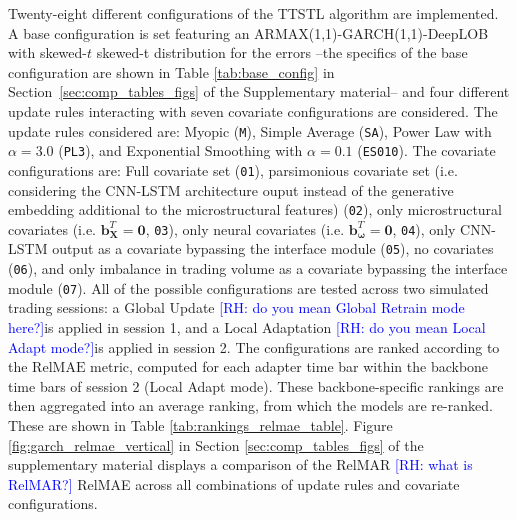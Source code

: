 \documentclass[10pt,a4paper,oneside]{article}
\newcommand{\rh}[1]{\textcolor{blue}{\textsf{[RH: #1]}}}
\providecommand{\DIFaddtex}[1]{{\protect\color{blue} \sf #1}} %
\providecommand{\DIFdeltex}[1]{{\protect\color{red} \scriptsize #1}} %
\providecommand{\DIFaddbegin}{} %
\providecommand{\DIFaddend}{} %
\providecommand{\DIFdelbegin}{} %
\providecommand{\DIFdelend}{} %
\providecommand{\DIFadd}[1]{\texorpdfstring{\DIFaddtex{#1}}{#1}} %
\providecommand{\DIFdel}[1]{\texorpdfstring{\DIFdeltex{#1}}{}} %
\newcommand{\DIFscaledelfig}{0.5}
\newlength{\DIFdelgraphicswidth} %
\newlength{\DIFdelgraphicsheight} %
\newcommand{\DIFaddincludegraphics}[2][]{{\color{blue}\fbox{\DIFOincludegraphics[#1]{#2}}}} %
\newcommand{\DIFdelincludegraphics}[2][]{%
\sbox{\DIFdelgraphicsbox}{\DIFOincludegraphics[#1]{#2}}%
\settoboxwidth{\DIFdelgraphicswidth}{\DIFdelgraphicsbox} %
\settoboxtotalheight{\DIFdelgraphicsheight}{\DIFdelgraphicsbox} %
\scalebox{\DIFscaledelfig}{%
\parbox[b]{\DIFdelgraphicswidth}{\usebox{\DIFdelgraphicsbox}\\[-\baselineskip] \rule{\DIFdelgraphicswidth}{0em}}\llap{\resizebox{\DIFdelgraphicswidth}{\DIFdelgraphicsheight}{%
\setlength{\unitlength}{\DIFdelgraphicswidth}%
\begin{picture}(1,1)%
\thicklines\linethickness{2pt} %
{\color[rgb]{1,0,0}\put(0,0){\framebox(1,1){}}}%
{\color[rgb]{1,0,0}\put(0,0){\line( 1,1){1}}}%
{\color[rgb]{1,0,0}\put(0,1){\line(1,-1){1}}}%
\end{picture}%
}\hspace*{3pt}}} %
} %
\DeclareRobustCommand{\DIFaddbegin}{\DIFOaddbegin \let\includegraphics\DIFaddincludegraphics} %
\DeclareRobustCommand{\DIFaddend}{\DIFOaddend \let\includegraphics\DIFOincludegraphics} %
\DeclareRobustCommand{\DIFdelbegin}{\DIFOdelbegin \let\includegraphics\DIFdelincludegraphics} %
\DeclareRobustCommand{\DIFdelend}{\DIFOaddend \let\includegraphics\DIFOincludegraphics} %
\begin{document}
Twenty-eight different configurations of the TTSTL algorithm are implemented. A base configuration is set featuring an ARMAX(1,1)-GARCH(1,1)-DeepLOB with \DIFdelbegin \DIFdel{skewed-$t$ }\DIFdelend \DIFaddbegin \DIFadd{skewed-t }\DIFaddend distribution for the errors --the specifics of the base configuration are shown in Table \ref{tab:base_config} in Section~\ref{sec:comp_tables_figs} of the Supplementary material-- and four different update rules interacting with seven covariate configurations are considered. The update rules considered are: Myopic (\verb|M|), Simple Average (\verb|SA|), Power Law with $\alpha = 3.0$ (\verb|PL3|), and Exponential Smoothing with $\alpha = 0.1$ (\verb|ES010|). The covariate configurations are: Full covariate set (\verb|01|), parsimonious covariate set (i.e. considering the CNN-LSTM architecture ouput instead of the generative embedding additional to the microstructural features) (\verb|02|), only microstructural covariates (i.e. $\mathbf{b}^T_{\mathbf{X}} = \mathbf{0}$, \verb|03|), only neural covariates (i.e. $\mathbf{b}^T_{\boldsymbol{\omega}} = \mathbf{0}$, \verb|04|), only CNN-LSTM output as a covariate bypassing the interface module (\verb|05|), no covariates (\verb|06|), and only imbalance in trading volume as a covariate bypassing the interface module (\verb|07|). All of the possible configurations are tested across two simulated trading sessions: a Global Update \DIFdelbegin \DIFdel{\rh{do you mean Global Retrain mode here?}}\DIFdelend is applied in session 1, and a Local Adaptation \DIFdelbegin \DIFdel{\rh{do you mean Local Adapt mode?}}\DIFdelend is applied in session 2. The configurations are ranked according to the $\mathrm{RelMAE}$ metric, computed for each adapter time bar within the backbone time bars of session 2 (Local Adapt mode). These backbone-specific rankings are then aggregated into an average ranking, from which the models are re-ranked. These are shown in Table \ref{tab:rankings_relmae_table}. Figure \ref{fig:garch_relmae_vertical} in Section \ref{sec:comp_tables_figs} of the supplementary material displays a comparison of the \DIFdelbegin \DIFdel{RelMAR \rh{what is RelMAR?} }\DIFdelend \DIFaddbegin \DIFadd{RelMAE }\DIFaddend across all combinations of update rules and covariate configurations.
\end{document}
